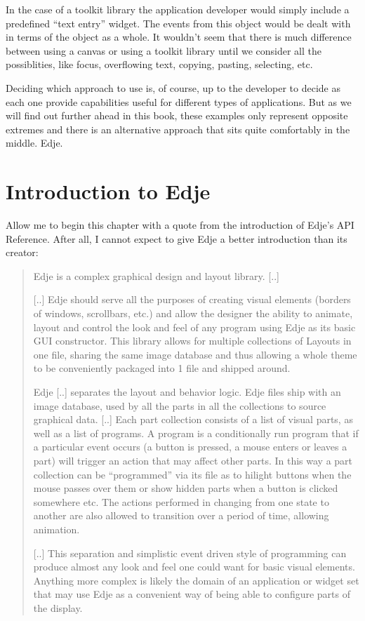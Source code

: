 \documentclass[12pt,a4paper,english]{book}
\begin{document}
In the case of a toolkit library the application developer would simply include
a predefined ``text entry'' widget. The events from this object would be dealt
with in terms of the object as a whole. It wouldn't seem that there is much
difference between using a canvas or using a toolkit library until we consider
all the possiblities, like focus, overflowing text, copying, pasting,
selecting, etc.

Deciding which approach to use is, of course, up to the developer to decide as
each one provide capabilities useful for different types of applications. But
as we will find out further ahead in this book, these examples only represent
opposite extremes and there is an alternative approach that sits quite
comfortably in the middle. Edje.



\hypertarget{introduction-to-edje}{}
\section{Introduction to Edje}

Allow me to begin this chapter with a quote from the introduction of Edje's API
Reference. After all, I cannot expect to give Edje a better introduction than
its creator:
\begin{quote}

Edje is a complex graphical design and layout library. {[}..{]}

{[}..{]} Edje should serve all the purposes of creating visual elements
(borders of windows, scrollbars, etc.) and allow the designer the ability
to animate, layout and control the look and feel of any program using Edje
as its basic GUI constructor. This library allows for multiple collections
of Layouts in one file, sharing the same image database and thus allowing a
whole theme to be conveniently packaged into 1 file and shipped around.

Edje {[}..{]} separates the layout and behavior logic. Edje files ship with an
image database, used by all the parts in all the collections to source
graphical data. {[}..{]} Each part collection consists of a list of visual
parts, as well as a list of programs. A program is a conditionally run
program that if a particular event occurs (a button is pressed, a mouse
enters or leaves a part) will trigger an action that may affect other
parts. In this way a part collection can be ``programmed'' via its file as to
hilight buttons when the mouse passes over them or show hidden parts when a
button is clicked somewhere etc. The actions performed in changing from one
state to another are also allowed to transition over a period of time,
allowing animation.

{[}..{]} This separation and simplistic event driven style of programming can
produce almost any look and feel one could want for basic visual elements.
Anything more complex is likely the domain of an application or widget set
that may use Edje as a convenient way of being able to configure parts of
the display.
\end{quote}
\end{document}
